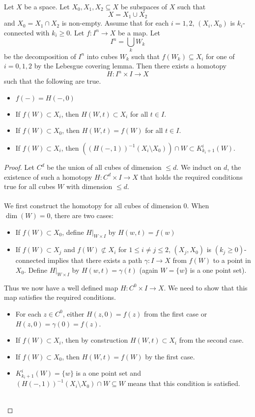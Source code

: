 \documentclass[a4paper]{article}
\begin{document}
\begin{lmm}{}{} Let $X$ be a space. Let $X_0,X_1,X_2\subseteq X$ be subspaces of $X$ such that $$X=X_1\cup X_2$$ and $X_0=X_1\cap X_2$ is non-empty. Assume that for each $i=1,2$, $(X_i,X_0)$ is $k_i$-connected with $k_i\geq 0$. Let $f:I^n\to X$ be a map. Let $$I^n=\bigcup_k W_k$$ be the decomposition of $I^n$ into cubes $W_k$ such that $f(W_k)\subseteq X_i$ for one of $i=0,1,2$ by the Lebesgue covering lemma. Then there exists a homotopy $$H:I^n\times I\to X$$ such that the following are true. 
\begin{itemize}
\item $f(-)=H(-,0)$
\item If $f(W)\subset X_i$, then $H(W,t)\subset X_i$ for all $t\in I$. 
\item If $f(W)\subset X_0$, then $H(W,t)=f(W)$ for all $t\in I$. 
\item If $f(W)\subset X_i$, then $\left((H(-,1))^{-1}(X_i\setminus X_0)\right)\cap W\subset K_{k_i+1}^i(W)$. 
\end{itemize} \tcbline
\begin{proof}
Let $C^d$ be the union of all cubes of dimension $\leq d$. We induct on $d$, the existence of such a homotopy $H:C^d\times I\to X$ that holds the required conditions true for all cubes $W$ with dimension $\leq d$. \\~\\

We first construct the homotopy for all cubes of dimension $0$. When $\dim(W)=0$, there are two cases: 
\begin{itemize}
\item If $f(W)\subset X_0$, define $H|_{W\times I}$ by $H(w,t)=f(w)$
\item If $f(W)\subset X_j$ and $f(W)\not\subset X_i$ for $1\leq i\neq j\leq 2$, $(X_j,X_0)$ is $(k_j\geq 0)$-connected implies that there exists a path $\gamma:I\to X$ from $f(W)$ to a point in $X_0$. Define $H|_{W\times I}$ by $H(w,t)=\gamma(t)$ (again $W=\{w\}$ is a one point set). 
\end{itemize}
Thus we now have a well defined map $H:C^0\times I\to X$. We need to show that this map satisfies the required conditions. 
\begin{itemize}
\item For each $z\in C^0$, either $H(z,0)=f(z)$ from the first case or $H(z,0)=\gamma(0)=f(z)$. 
\item If $f(W)\subset X_i$, then by construction $H(W,t)\subset X_i$ from the second case. 
\item If $f(W)\subset X_0$, then $H(W,t)=f(W)$ by the first case. 
\item $K_{k_i+1}^i(W)=\{w\}$ is a one point set and $(H(-,1))^{-1}(X_i\setminus X_0)\cap W\subseteq W$ means that this condition is satisfied. 
\end{itemize}~\\


\end{proof}
\end{lmm}
\end{document}
